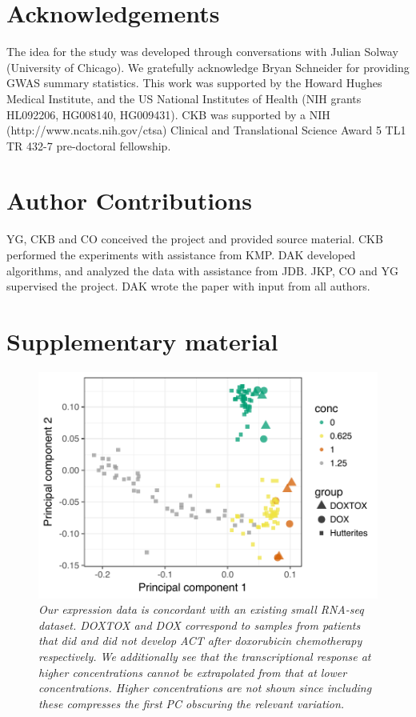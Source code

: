 \documentclass{article}
\begin{document}
\section*{Acknowledgements}

The idea for the study was developed through conversations with Julian Solway (University of Chicago). We gratefully acknowledge Bryan Schneider for providing GWAS summary statistics. This work was supported by the Howard Hughes Medical Institute, and the US National Institutes of Health (NIH grants HL092206, HG008140, HG009431). 
CKB was supported by a NIH (http://www.ncats.nih.gov/ctsa) Clinical and Translational Science Award 5 TL1 TR 432-7 pre-doctoral fellowship.

\section*{Author Contributions}

YG, CKB and CO conceived the project and provided source material.
CKB performed the experiments with assistance from KMP.
DAK developed algorithms, and analyzed the data with assistance from JDB.
JKP, CO and YG supervised the project.
DAK wrote the paper with input from all authors.

     
\clearpage

\setcounter{figure}{0}
\makeatletter 
\renewcommand{\thefigure}{S\@arabic\c@figure}

\section*{Supplementary material} 

\begin{figure}[h]
\begin{center}
    \includegraphics[width=.6\textwidth]{../figures/burridge_comparison.pdf} %
    \caption{\it{Our expression data is concordant with an existing small RNA-seq dataset\citep{Burridge2016}. DOXTOX and DOX correspond to samples from patients that did and did not develop ACT after doxorubicin chemotherapy respectively. We additionally see that the transcriptional response at higher concentrations cannot be extrapolated from that at lower concentrations. Higher concentrations are not shown since including these compresses the first PC obscuring the relevant variation.}}
    \label{fig:burridge}
    \end{center}
\end{figure}
\end{document}
